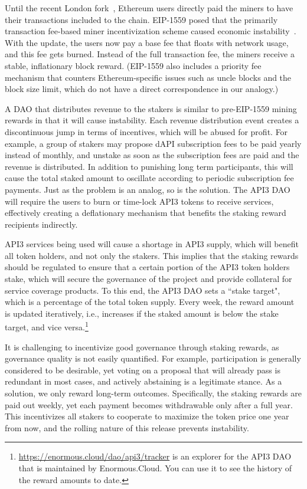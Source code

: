 \documentclass[11pt]{article}
\begin{document}
Until the recent London fork~\cite{london}, Ethereum users directly paid the miners to have their transactions included to the chain.
EIP-1559 posed that the primarily transaction fee-based miner incentivization scheme caused economic instability~\cite{roughgarden:2020}.
With the update, the users now pay a base fee that floats with network usage, and this fee gets burned.
Instead of the full transaction fee, the miners receive a stable, inflationary block reward.
(EIP-1559 also includes a priority fee mechanism that counters Ethereum-specific issues such as uncle blocks and the block size limit, which do not have a direct correspondence in our analogy.)

A DAO that distributes revenue to the stakers is similar to pre-EIP-1559 mining rewards in that it will cause instability.
Each revenue distribution event creates a discontinuous jump in terms of incentives, which will be abused for profit.
For example, a group of stakers may propose dAPI subscription fees to be paid yearly instead of monthly, and unstake as soon as the subscription fees are paid and the revenue is distributed.
In addition to punishing long term participants, this will cause the total staked amount to oscillate according to periodic subscription fee payments.
Just as the problem is an analog, so is the solution.
The API3 DAO will require the users to burn or time-lock API3 tokens to receive services, effectively creating a deflationary mechanism that benefits the staking reward recipients indirectly.

API3 services being used will cause a shortage in API3 supply, which will benefit all token holders, and not only the stakers.
This implies that the staking rewards should be regulated to ensure that a certain portion of the API3 token holders stake, which will secure the governance of the project and provide collateral for service coverage products.
To this end, the API3 DAO sets a ``stake target", which is a percentage of the total token supply.
Every week, the reward amount is updated iteratively, i.e., increases if the staked amount is below the stake target, and vice versa.\footnote{\url{https://enormous.cloud/dao/api3/tracker} is an explorer for the API3 DAO that is maintained by Enormous.Cloud. You can use it to see the history of the reward amounts to date.}

It is challenging to incentivize good governance through staking rewards, as governance quality is not easily quantified.
For example, participation is generally considered to be desirable, yet voting on a proposal that will already pass is redundant in most cases, and actively abstaining is a legitimate stance.
As a solution, we only reward long-term outcomes.
Specifically, the staking rewards are paid out weekly, yet each payment becomes withdrawable only after a full year.
This incentivizes all stakers to cooperate to maximize the token price one year from now, and the rolling nature of this release prevents instability.
\end{document}
